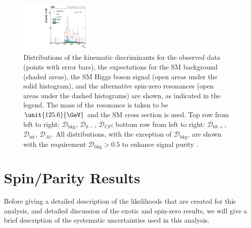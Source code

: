 \begin{figure}
\includegraphics[width=0.32\textwidth]{Spin_Parity/cCompare_DataMC_AllTeV_D_g1Q2_phi0_SignalEnriched.pdf}
\caption[Distributions of the kinematic discriminants for
the observed data (points with error bars), the expectations for the SM background (shaded areas),
the SM Higgs boson signal (open areas under the solid histogram),
and the alternative spin-zero resonances (open areas under the dashed histograms) are shown,
as indicated in the legend.
The mass of the resonance is taken to be $\unit{125.6}{\GeV}$ and the SM cross section is used.
Top row from left to right:
$\mathcal{D}_\text{bkg}$,
$\mathcal{D}_{0-}$,
$\mathcal{D}_{C\!P}$;
bottom row from left to right:
$\mathcal{D}_{0h+}$,
$\mathcal{D}_\text{int}$,
$\mathcal{D}_{\Lambda1}$.
All distributions, with the exception of $\mathcal{D}_\text{bkg}$, are shown
with the requirement $\mathcal{D}_\text{bkg}>0.5$ to enhance signal purity.]{
Distributions of the kinematic discriminants for
the observed data (points with error bars), the expectations for the SM background (shaded areas),
the SM Higgs boson signal (open areas under the solid histogram),
and the alternative spin-zero resonances (open areas under the dashed histograms) are shown,
as indicated in the legend.
The mass of the resonance is taken to be $\unit{125.6}{\GeV}$ and the SM cross section is used.
Top row from left to right:
$\mathcal{D}_\text{bkg}$,
$\mathcal{D}_{0-}$,
$\mathcal{D}_{C\!P}$;
bottom row from left to right:
$\mathcal{D}_{0h+}$,
$\mathcal{D}_\text{int}$,
$\mathcal{D}_{\Lambda1}$.
All distributions, with the exception of $\mathcal{D}_\text{bkg}$, are shown
with the requirement $\mathcal{D}_\text{bkg}>0.5$ to enhance signal purity \cite{Khachatryan:2014kca}.
}
\label{fig:discriminants}

\end{figure}


\section{Spin/Parity Results}
\label{sec:SpinParity_Results}

Before giving a detailed description of the likelihoods that are created for this analysis, and detailed discussion of the exotic and spin-zero results, we will give a brief description of the systematic uncertainties used in this analysis.

